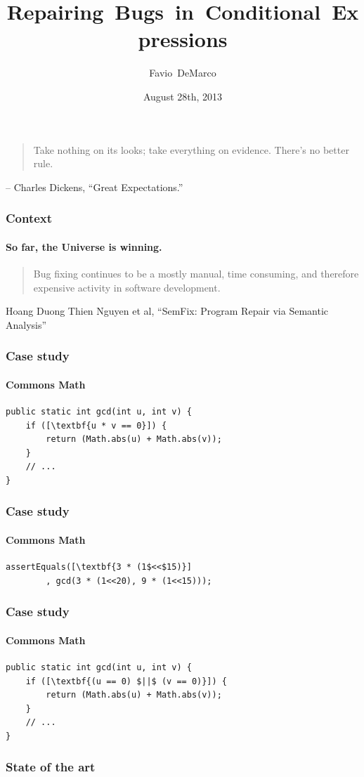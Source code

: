 \documentclass{beamer}
\title[{Repairing Bugs in Conditional Expressions}]{Repairing~Bugs~in~Conditional~Expressions}
\author[Favio DeMarco]{Favio~DeMarco}
\institute[U.B.A. - INRIA]{Universidad de Buenos Aires - INRIA}
\date[08/28/2013]{August 28th, 2013}
\begin{document}
  \frame
  {
\begin{quote}
    Take nothing on its looks; take everything on evidence. There's no better rule.
\end{quote}    
– Charles Dickens, ``Great Expectations.''
  }

\frame
  {
    \titlepage
  }

  \frame
  {
    \frametitle{Context}
    \framesubtitle{So far, the Universe is winning.}
    \begin{quote}
    Bug fixing continues to be a mostly manual, time consuming, and therefore expensive activity in software development.
    \end{quote}
    Hoang Duong Thien Nguyen et al, ``SemFix: Program Repair via Semantic Analysis''
}

 \begin{frame}[fragile]
    \frametitle{Case study}
      \framesubtitle{Commons Math}
        \begin{lstlisting}[escapeinside=\[\]]
public static int gcd(int u, int v) {
    if ([\textbf{u * v == 0}]) {
        return (Math.abs(u) + Math.abs(v));
    }
    // ...
}
	\end{lstlisting}
\end{frame}

 \begin{frame}[fragile]
    \frametitle{Case study}
      \framesubtitle{Commons Math}
        \begin{lstlisting}[escapeinside=\[\]]
assertEquals([\textbf{3 * (1$<<$15)}]
        , gcd(3 * (1<<20), 9 * (1<<15)));
	\end{lstlisting}
\end{frame}

 \begin{frame}[fragile]
    \frametitle{Case study}
      \framesubtitle{Commons Math}
        \begin{lstlisting}[escapeinside=\[\]]
public static int gcd(int u, int v) {
    if ([\textbf{(u == 0) $||$ (v == 0)}]) {
        return (Math.abs(u) + Math.abs(v));
    }
    // ...
}
	\end{lstlisting}
\end{frame}

{
%
  \frame
  {
    \frametitle{State of the art}
  }
}
\end{document}
